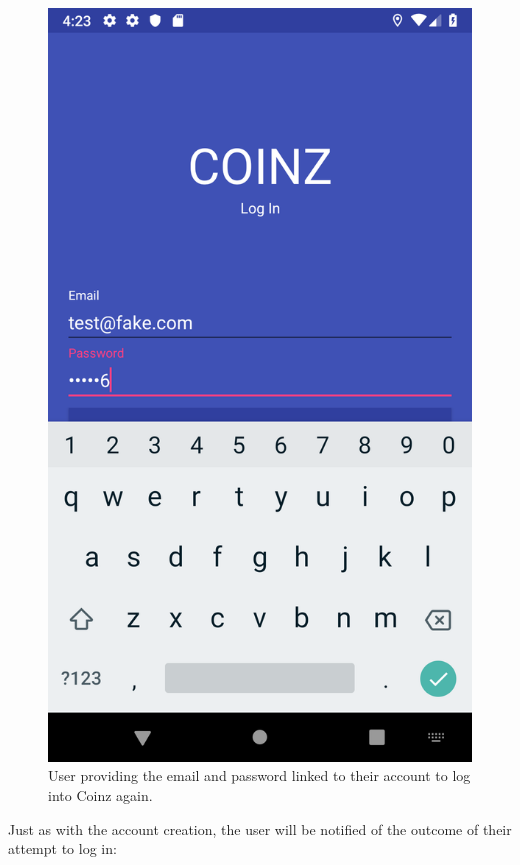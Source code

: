 \documentclass[11pt,a4paper,notitlepage]{article}
\begin{document}
\begin{figure}[H]
    \centering
    \includegraphics[scale=0.25]{screenshots/log-in/log-in-screen-logging-in.png}
    \caption{User providing the email and password linked to their account to log into Coinz again.}
\end{figure}

    Just as with the account creation, the user will be notified of the outcome of their attempt to log in:
\end{document}
